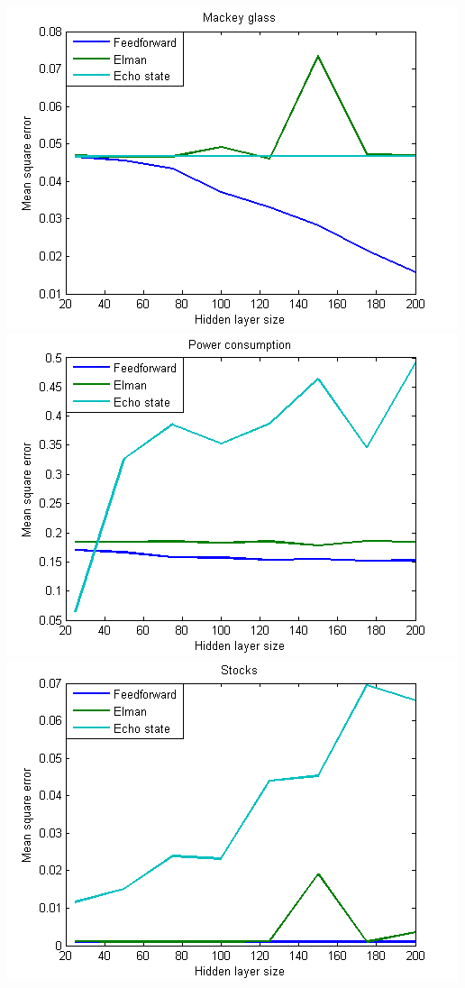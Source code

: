 \documentclass{acm_proc_article-sp}
\begin{document}
\includegraphics[scale=0.7]{mackey_plot.png}
\includegraphics[scale=0.7]{power_plot.png}
\includegraphics[scale=0.7]{stocks_plot.png}
\end{document}
